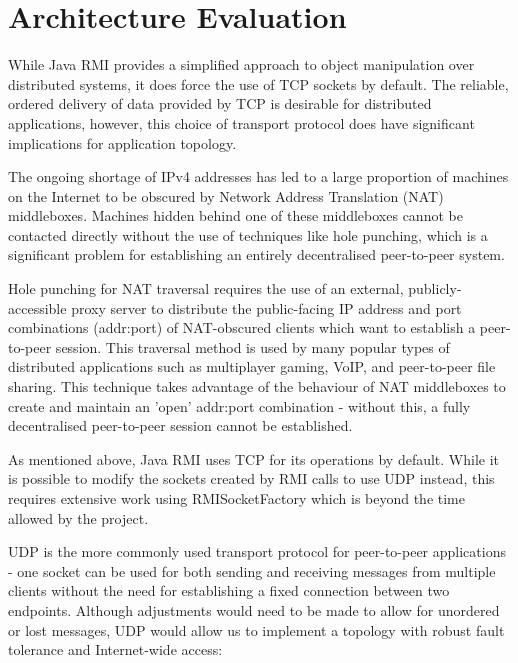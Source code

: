 \documentclass[conference]{IEEEtran}
\begin{document}
\section{Architecture Evaluation}
While Java RMI provides a simplified approach to object manipulation over distributed systems, it does force the use of TCP sockets by default. The reliable, ordered delivery of data provided by TCP is desirable for distributed applications, however, this choice of transport protocol does have significant implications for application topology.

The ongoing shortage of IPv4 addresses has led to a large proportion of machines on the Internet to be obscured by Network Address Translation (NAT) middleboxes. Machines hidden behind one of these middleboxes cannot be contacted directly without the use of techniques like hole punching, which is a significant problem for establishing an entirely decentralised peer-to-peer system.

Hole punching for NAT traversal requires the use of an external, publicly-accessible proxy server to distribute the public-facing IP address and port combinations (addr:port) of NAT-obscured clients which want to establish a peer-to-peer session. This traversal method is used by many popular types of distributed applications such as multiplayer gaming, VoIP, and peer-to-peer file sharing. This technique takes advantage of the behaviour of NAT middleboxes to create and maintain an 'open' addr:port combination - without this, a fully decentralised peer-to-peer session cannot be established.

As mentioned above, Java RMI uses TCP for its operations by default. While it is possible to modify the sockets created by RMI calls to use UDP instead, this requires extensive work using RMISocketFactory which is beyond the time allowed by the project.

UDP is the more commonly used transport protocol for peer-to-peer applications - one socket can be used for both sending and receiving messages from multiple clients without the need for establishing a fixed connection between two endpoints. Although adjustments would need to be made to allow for unordered or lost messages, UDP would allow us to implement a topology with robust fault tolerance and Internet-wide access:
\end{document}
